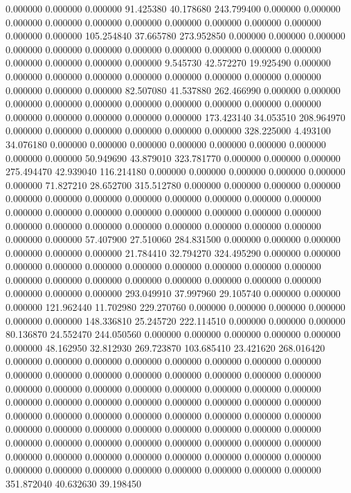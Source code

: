 0.000000 0.000000 0.000000
91.425380 40.178680 243.799400
0.000000 0.000000 0.000000
0.000000 0.000000 0.000000
0.000000 0.000000 0.000000
0.000000 0.000000 0.000000
105.254840 37.665780 273.952850
0.000000 0.000000 0.000000
0.000000 0.000000 0.000000
0.000000 0.000000 0.000000
0.000000 0.000000 0.000000
0.000000 0.000000 0.000000
9.545730 42.572270 19.925490
0.000000 0.000000 0.000000
0.000000 0.000000 0.000000
0.000000 0.000000 0.000000
0.000000 0.000000 0.000000
82.507080 41.537880 262.466990
0.000000 0.000000 0.000000
0.000000 0.000000 0.000000
0.000000 0.000000 0.000000
0.000000 0.000000 0.000000
0.000000 0.000000 0.000000
173.423140 34.053510 208.964970
0.000000 0.000000 0.000000
0.000000 0.000000 0.000000
328.225000 4.493100 34.076180
0.000000 0.000000 0.000000
0.000000 0.000000 0.000000
0.000000 0.000000 0.000000
50.949690 43.879010 323.781770
0.000000 0.000000 0.000000
275.494470 42.939040 116.214180
0.000000 0.000000 0.000000
0.000000 0.000000 0.000000
71.827210 28.652700 315.512780
0.000000 0.000000 0.000000
0.000000 0.000000 0.000000
0.000000 0.000000 0.000000
0.000000 0.000000 0.000000
0.000000 0.000000 0.000000
0.000000 0.000000 0.000000
0.000000 0.000000 0.000000
0.000000 0.000000 0.000000
0.000000 0.000000 0.000000
0.000000 0.000000 0.000000
57.407900 27.510060 284.831500
0.000000 0.000000 0.000000
0.000000 0.000000 0.000000
21.784410 32.794270 324.495290
0.000000 0.000000 0.000000
0.000000 0.000000 0.000000
0.000000 0.000000 0.000000
0.000000 0.000000 0.000000
0.000000 0.000000 0.000000
0.000000 0.000000 0.000000
0.000000 0.000000 0.000000
293.049910 37.997960 29.105740
0.000000 0.000000 0.000000
121.962440 11.702980 229.270760
0.000000 0.000000 0.000000
0.000000 0.000000 0.000000
148.336810 25.245720 222.114510
0.000000 0.000000 0.000000
80.136870 24.552470 244.050560
0.000000 0.000000 0.000000
0.000000 0.000000 0.000000
48.162950 32.812930 269.723870
103.685410 23.421620 268.016420
0.000000 0.000000 0.000000
0.000000 0.000000 0.000000
0.000000 0.000000 0.000000
0.000000 0.000000 0.000000
0.000000 0.000000 0.000000
0.000000 0.000000 0.000000
0.000000 0.000000 0.000000
0.000000 0.000000 0.000000
0.000000 0.000000 0.000000
0.000000 0.000000 0.000000
0.000000 0.000000 0.000000
0.000000 0.000000 0.000000
0.000000 0.000000 0.000000
0.000000 0.000000 0.000000
0.000000 0.000000 0.000000
0.000000 0.000000 0.000000
0.000000 0.000000 0.000000
0.000000 0.000000 0.000000
0.000000 0.000000 0.000000
0.000000 0.000000 0.000000
0.000000 0.000000 0.000000
0.000000 0.000000 0.000000
0.000000 0.000000 0.000000
0.000000 0.000000 0.000000
351.872040 40.632630 39.198450
